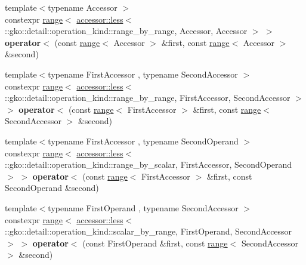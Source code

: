 \begin{DoxyCompactItemize}
\item 
\mbox{\label{namespacegko_ab86394e93b6c232aae4816b59bdcca96}} 
{\footnotesize template$<$typename Accessor $>$ }\\constexpr \hyperlink{classgko_1_1range}{range}$<$ \hyperlink{structgko_1_1accessor_1_1less}{accessor\+::less}$<$ \+::gko\+::detail\+::operation\+\_\+kind\+::range\+\_\+by\+\_\+range, Accessor, Accessor $>$ $>$ {\bfseries operator$<$} (const \hyperlink{classgko_1_1range}{range}$<$ Accessor $>$ \&first, const \hyperlink{classgko_1_1range}{range}$<$ Accessor $>$ \&second)
\item 
\mbox{\label{namespacegko_ae8b90df104f6069d07d0d7a81a21d1de}} 
{\footnotesize template$<$typename First\+Accessor , typename Second\+Accessor $>$ }\\constexpr \hyperlink{classgko_1_1range}{range}$<$ \hyperlink{structgko_1_1accessor_1_1less}{accessor\+::less}$<$ \+::gko\+::detail\+::operation\+\_\+kind\+::range\+\_\+by\+\_\+range, First\+Accessor, Second\+Accessor $>$ $>$ {\bfseries operator$<$} (const \hyperlink{classgko_1_1range}{range}$<$ First\+Accessor $>$ \&first, const \hyperlink{classgko_1_1range}{range}$<$ Second\+Accessor $>$ \&second)
\item 
\mbox{\label{namespacegko_a06e29cc3ae776a00c79b7a3b8fdf2ef9}} 
{\footnotesize template$<$typename First\+Accessor , typename Second\+Operand $>$ }\\constexpr \hyperlink{classgko_1_1range}{range}$<$ \hyperlink{structgko_1_1accessor_1_1less}{accessor\+::less}$<$ \+::gko\+::detail\+::operation\+\_\+kind\+::range\+\_\+by\+\_\+scalar, First\+Accessor, Second\+Operand $>$ $>$ {\bfseries operator$<$} (const \hyperlink{classgko_1_1range}{range}$<$ First\+Accessor $>$ \&first, const Second\+Operand \&second)
\item 
\mbox{\label{namespacegko_afe4f898ac5f7d9aedbabd1b361943982}} 
{\footnotesize template$<$typename First\+Operand , typename Second\+Accessor $>$ }\\constexpr \hyperlink{classgko_1_1range}{range}$<$ \hyperlink{structgko_1_1accessor_1_1less}{accessor\+::less}$<$ \+::gko\+::detail\+::operation\+\_\+kind\+::scalar\+\_\+by\+\_\+range, First\+Operand, Second\+Accessor $>$ $>$ {\bfseries operator$<$} (const First\+Operand \&first, const \hyperlink{classgko_1_1range}{range}$<$ Second\+Accessor $>$ \&second)

\end{DoxyCompactItemize}
